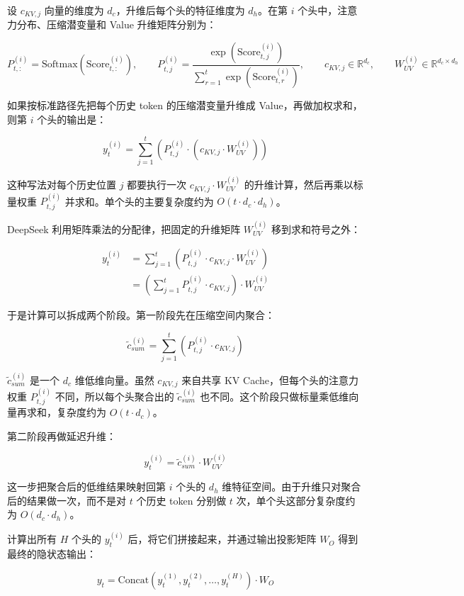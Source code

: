 设 \(c_{KV,j}\) 向量的维度为 \(d_c\)，升维后每个头的特征维度为 \(d_h\)。在第 \(i\) 个头中，注意力分布、压缩潜变量和 Value 升维矩阵分别为：

\[
P_{t,:}^{(i)} = \mathrm{Softmax}(\mathrm{Score}_{t,:}^{(i)}),\qquad
P_{t,j}^{(i)} =
\frac{\exp(\mathrm{Score}_{t,j}^{(i)})}{\sum_{r=1}^{t}\exp(\mathrm{Score}_{t,r}^{(i)})},\qquad
c_{KV,j}\in \mathbb{R}^{d_c},\qquad
W_{UV}^{(i)}\in \mathbb{R}^{d_c \times d_h}
\]

如果按标准路径先把每个历史 token 的压缩潜变量升维成 Value，再做加权求和，则第 \(i\) 个头的输出是：

\[
y_t^{(i)}
=
\sum_{j=1}^{t}
\left(P_{t,j}^{(i)} \cdot (c_{KV,j} \cdot W_{UV}^{(i)})\right)
\]

这种写法对每个历史位置 \(j\) 都要执行一次 \(c_{KV,j} \cdot W_{UV}^{(i)}\) 的升维计算，然后再乘以标量权重 \(P_{t,j}^{(i)}\) 并求和。单个头的主要复杂度约为 \(O(t \cdot d_c \cdot d_h)\)。

DeepSeek 利用矩阵乘法的分配律，把固定的升维矩阵 \(W_{UV}^{(i)}\) 移到求和符号之外：

\[
\begin{aligned}
y_t^{(i)}
&= \sum_{j=1}^{t}\left(P_{t,j}^{(i)} \cdot c_{KV,j} \cdot W_{UV}^{(i)}\right) \\
&= \left(\sum_{j=1}^{t}P_{t,j}^{(i)} \cdot c_{KV,j}\right) \cdot W_{UV}^{(i)}
\end{aligned}
\]

于是计算可以拆成两个阶段。第一阶段先在压缩空间内聚合：

\[
\tilde c_{sum}^{(i)}
=
\sum_{j=1}^{t}\left(P_{t,j}^{(i)} \cdot c_{KV,j}\right)
\]

\(\tilde c_{sum}^{(i)}\) 是一个 \(d_c\) 维低维向量。虽然 \(c_{KV,j}\) 来自共享 KV Cache，但每个头的注意力权重 \(P_{t,j}^{(i)}\) 不同，所以每个头聚合出的 \(\tilde c_{sum}^{(i)}\) 也不同。这个阶段只做标量乘低维向量再求和，复杂度约为 \(O(t \cdot d_c)\)。

第二阶段再做延迟升维：

\[
y_t^{(i)} = \tilde c_{sum}^{(i)} \cdot W_{UV}^{(i)}
\]

这一步把聚合后的低维结果映射回第 \(i\) 个头的 \(d_h\) 维特征空间。由于升维只对聚合后的结果做一次，而不是对 \(t\) 个历史 token 分别做 \(t\) 次，单个头这部分复杂度约为 \(O(d_c \cdot d_h)\)。

计算出所有 \(H\) 个头的 \(y_t^{(i)}\) 后，将它们拼接起来，并通过输出投影矩阵 \(W_O\) 得到最终的隐状态输出：

\[
y_t
=
\mathrm{Concat}\left(y_t^{(1)}, y_t^{(2)}, \ldots, y_t^{(H)}\right) \cdot W_O
\]

